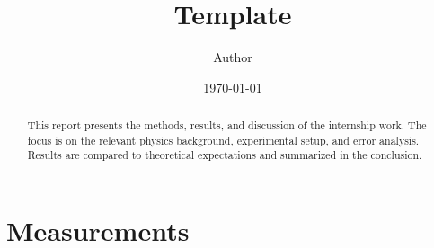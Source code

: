 \documentclass{article}
\numberwithin{equation}{section}
\numberwithin{algorithm}{section}
\begin{document}

\title{Template}
\author{Author}
\date{\today}
\maketitle

\clearpage

\begin{abstract}
This report presents the methods, results, and discussion of the internship work.
The focus is on the relevant physics background, experimental setup, and error
analysis. Results are compared to theoretical expectations and summarized in the
conclusion.
\end{abstract}
\clearpage

\setcounter{tocdepth}{2}
\tableofcontents

\clearpage





\section{Measurements}








\printbibliography


\end{document}

